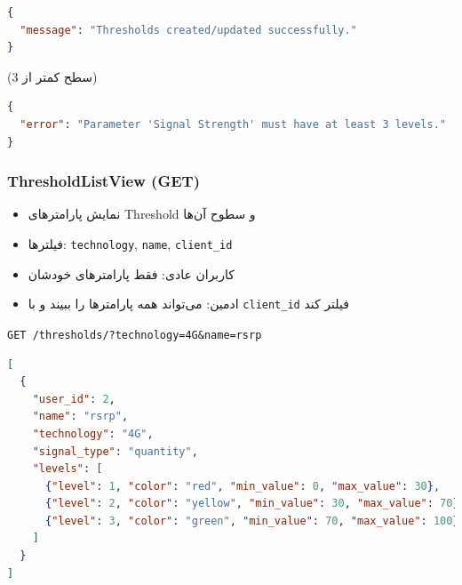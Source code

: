 \documentclass{report}
\begin{document}
\begin{lstlisting}[language=json]
{
  "message": "Thresholds created/updated successfully."
}
\end{lstlisting}

(سطح کمتر از 3)
\begin{lstlisting}[language=json]
{
  "error": "Parameter 'Signal Strength' must have at least 3 levels."
}
\end{lstlisting}

\subsubsection{ThresholdListView (GET)}
\begin{itemize}
    \item نمایش پارامترهای Threshold و سطوح آن‌ها
    \item فیلترها: \texttt{technology}, \texttt{name}, \texttt{client\_id}
    \item کاربران عادی: فقط پارامترهای خودشان
    \item ادمین: می‌تواند همه پارامترها را ببیند و با \texttt{client\_id} فیلتر کند
\end{itemize}

\begin{center}
	\begin{latin}
		\texttt{GET /thresholds/?technology=4G\&name=rsrp}
	\end{latin}
\end{center}

\begin{lstlisting}[language=json]
[
  {
    "user_id": 2,
    "name": "rsrp",
    "technology": "4G",
    "signal_type": "quantity",
    "levels": [
      {"level": 1, "color": "red", "min_value": 0, "max_value": 30},
      {"level": 2, "color": "yellow", "min_value": 30, "max_value": 70},
      {"level": 3, "color": "green", "min_value": 70, "max_value": 100}
    ]
  }
]
\end{lstlisting}

 
\end{document}
